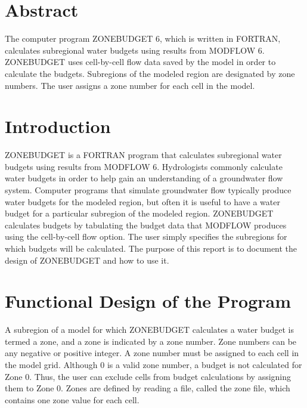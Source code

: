 \documentclass[11pt,twoside,twocolumn]{usgsreport}
\begin{document}
\ifdef{\makefrontcoveralt}{\makefrontcoveralt}{\makefrontcover}

\ifdef{\makefrontmatterabv}{\makefrontmatterabv}{\makefrontmatter}

\onecolumn
\pagestyle{body}
\RaggedRight
{}
\pagestyle{body}
\setlength{\parindent}{1.5pc}

\section{Abstract}
The computer program ZONEBUDGET 6, which is written in FORTRAN, calculates subregional water budgets using results from MODFLOW 6. ZONEBUDGET uses cell-by-cell flow data saved by the model in order to calculate the budgets. Subregions of the modeled region are designated by zone numbers. The user assigns a zone number for each cell in the model. 

\section{Introduction}
ZONEBUDGET is a FORTRAN program that calculates subregional water budgets using results from MODFLOW 6. Hydrologists commonly calculate water budgets in order to help gain an understanding of a groundwater flow system. Computer programs that simulate groundwater flow typically produce water budgets for the modeled region, but often it is useful to have a water budget for a particular subregion of the modeled region. ZONEBUDGET calculates budgets by tabulating the budget data that MODFLOW produces using the cell-by-cell flow option. The user simply specifies the subregions for which budgets will be calculated. The purpose of this report is to document the design of ZONEBUDGET and how to use it.

\section{Functional Design of the Program}
A subregion of a model for which ZONEBUDGET calculates a water budget is termed a zone, and a zone is indicated by a zone number. Zone numbers can be any negative or positive integer.  A zone number must be assigned to each cell in the model grid. Although 0 is a valid zone number, a budget is not calculated for Zone 0. Thus, the user can exclude cells from budget calculations by assigning them to Zone 0. Zones are defined by reading a file, called the zone file, which contains one zone value for each cell.  
\end{document}
